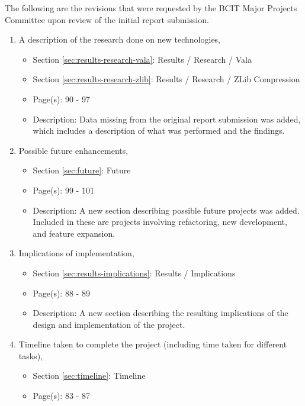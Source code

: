 \documentclass[11pt]{article}
\begin{document}
      The following are the revisions that were requested by the BCIT Major
      Projects Committee upon review of the initial report submission.

      \begin{enumerate}
        \item A description of the research done on new technologies,
          \begin{itemize}
            \item Section \ref{sec:results-research-vala}: Results / Research / Vala
            \item Section \ref{sec:results-research-zlib}: Results / Research / ZLib Compression
            \item Page(s): 90 - 97
            \item Description: Data missing from the original report submission
              was added, which includes a description of what was performed and
              the findings.
          \end{itemize}
        \item Possible future enhancements,
          \begin{itemize}
            \item Section \ref{sec:future}: Future
            \item Page(s): 99 - 101
            \item Description: A new section describing possible future
              projects was added. Included in these are projects involving
              refactoring, new development, and feature expansion.
          \end{itemize}
        \item Implications of implementation,
          \begin{itemize}
            \item Section \ref{sec:results-implications}: Results / Implications
            \item Page(s): 88 - 89
            \item Description: A new section describing the resulting
              implications of the design and implementation of the project.
          \end{itemize}
        \item Timeline taken to complete the project (including time taken for
          different tasks),
          \begin{itemize}
            \item Section \ref{sec:timeline}: Timeline
            \item Page(s): 83 - 87

\end{itemize}
\end{enumerate}
\end{document}
